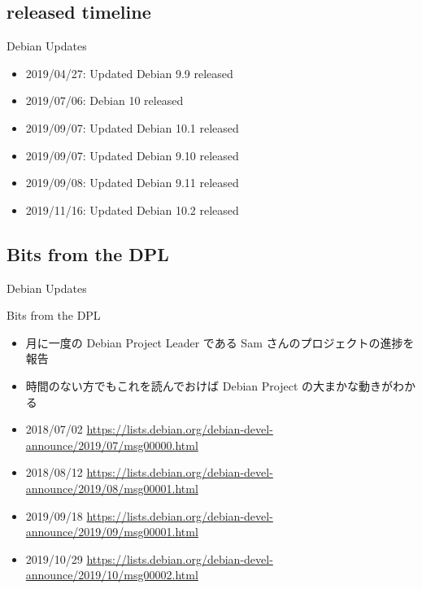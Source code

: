 \documentclass[mingoth,a4paper]{jsarticle}
\begin{document}




\subsection{released timeline}

{Debian Updates}%

\begin{itemize}
\item 2019/04/27:  Updated Debian 9.9  released
\item 2019/07/06:  Debian 10 released
\item 2019/09/07:  Updated Debian 10.1 released
\item 2019/09/07:  Updated Debian 9.10 released
\item 2019/09/08:  Updated Debian 9.11 released
\item 2019/11/16:  Updated Debian 10.2 released
\end{itemize}




\subsection{Bits from the DPL}

{Debian Updates}%

Bits from the DPL

\begin{itemize}
\item 月に一度の Debian Project Leader である Sam さんのプロジェクトの進捗を報告
\item 時間のない方でもこれを読んでおけば Debian Project の大まかな動きがわかる
\end{itemize}

\small{
\begin{itemize}

\item 2018/07/02 \url{https://lists.debian.org/debian-devel-announce/2019/07/msg00000.html}
\item 2018/08/12 \url{https://lists.debian.org/debian-devel-announce/2019/08/msg00001.html}
\item 2019/09/18 \url{https://lists.debian.org/debian-devel-announce/2019/09/msg00001.html}
\item 2019/10/29 \url{https://lists.debian.org/debian-devel-announce/2019/10/msg00002.html}

\end{itemize}
}
\end{document}
